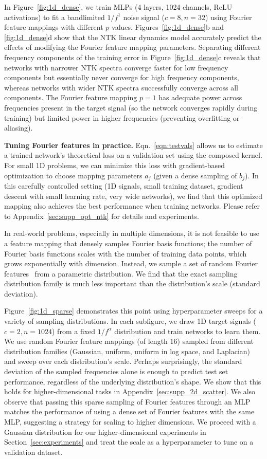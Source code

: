 In Figure~\ref{fig:1d_dense}, we train MLPs (4 layers, 1024 channels, ReLU activations) to fit a bandlimited $1/f^1$ noise signal ($c=8,n=32$) using Fourier feature mappings with different $p$ values. Figures~\ref{fig:1d_dense}b and \ref{fig:1d_dense}d show that the NTK linear dynamics model accurately predict the effects of modifying the Fourier feature mapping parameters. Separating different frequency components of the training error in Figure~\ref{fig:1d_dense}c reveals that networks with narrower NTK spectra converge faster for low frequency components but essentially never converge for high frequency components, whereas networks with wider NTK spectra successfully converge across all components. The Fourier feature mapping $p=1$ has adequate power across frequencies present in the target signal (so the network converges rapidly during training) but limited power in higher frequencies (preventing overfitting or aliasing).

{\bf Tuning Fourier features in practice.}
Eqn.~\ref{eqn:testvals} allows us to estimate a trained network's theoretical loss on a validation set using the composed kernel. For small 1D problems, we can minimize this loss with gradient-based optimization to choose mapping parameters $a_j$ (given a dense sampling of $b_j$). In this carefully controlled setting (1D signals, small training dataset, gradient descent with small learning rate, very wide networks), we find that this optimized mapping also achieves the best performance when training networks. Please refer to Appendix~\ref{sec:supp_opt_ntk} for details and experiments. 

In real-world problems, especially in multiple dimensions, it is not feasible to use a feature mapping that densely samples Fourier basis functions; the number of Fourier basis functions scales with the number of training data points, which grows exponentially with dimension. Instead, we sample a set of random Fourier features~\cite{rahimi2007} from a parametric distribution. We find that the exact sampling distribution family is much less important than the distribution's scale (standard deviation).

Figure~\ref{fig:1d_sparse} demonstrates this point using hyperparameter sweeps for a variety of sampling distributions. In each subfigure, we draw 1D target signals ($c=2,n=1024$) from a fixed $1/f^\alpha$ distribution and train networks to learn them. We use random Fourier feature mappings (of length 16) sampled from different distribution families (Gaussian, uniform, uniform in log space, and Laplacian) and sweep over each distribution's scale. Perhaps surprisingly, the standard deviation of the sampled frequencies alone is enough to predict test set performance, regardless of the underlying distribution's shape. We show that this holds for higher-dimensional tasks in Appendix~\ref{sec:supp_2d_scatter}. We also observe that passing this sparse sampling of Fourier features through an MLP matches the performance of using a dense set of Fourier features with the same MLP, suggesting a strategy for scaling to higher dimensions. We proceed with a Gaussian distribution for our higher-dimensional experiments in Section~\ref{sec:experiments} and treat the scale as a hyperparameter to tune on a validation dataset.

